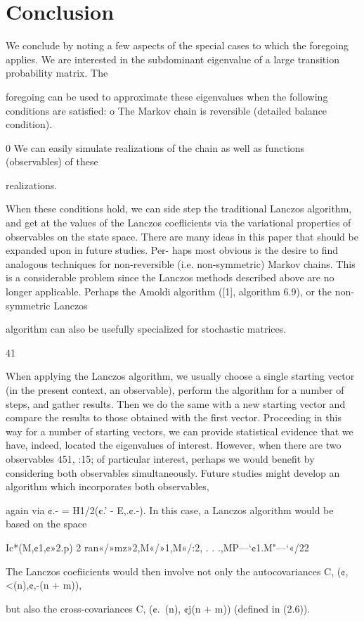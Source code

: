 \chapter{Conclusion}
\label{cha:conclusion}

We conclude by noting a few aspects of the special cases to which the foregoing applies.
We are interested in the subdominant eigenvalue of a large transition probability matrix. The

foregoing can be used to approximate these eigenvalues when the following conditions are satisﬁed:
o The Markov chain is reversible (detailed balance condition).

0 We can easily simulate realizations of the chain as well as functions (observables) of these

realizations.

When these conditions hold, we can side step the traditional Lanczos algorithm, and get at the
values of the Lanczos coeﬂicients via the variational properties of observables on the state space.
There are many ideas in this paper that should be expanded upon in future studies. Per-
haps most obvious is the desire to ﬁnd analogous techniques for non-reversible (i.e. non-symmetric)
Markov chains. This is a considerable problem since the Lanczos methods described above are no
longer applicable. Perhaps the Amoldi algorithm ([1], algorithm 6.9), or the non-symmetric Lanczos

algorithm can also be usefully specialized for stochastic matrices.

41

When applying the Lanczos algorithm, we usually choose a single starting vector (in the
present context, an observable), perform the algorithm for a number of steps, and gather results.
Then we do the same with a new starting vector and compare the results to those obtained with
the ﬁrst vector. Proceeding in this way for a number of starting vectors, we can provide statistical
evidence that we have, indeed, located the eigenvalues of interest. However, when there are two
observables 451, :15; of particular interest, perhaps we would beneﬁt by considering both observables
simultaneously. Future studies might develop an algorithm which incorporates both observables,

again via ¢.- = H1/2(¢.' - E,.¢.-). In this case, a Lanczos algorithm would be based on the space

Ic*(M,¢1,¢»2.p) 2 ran{«/»mz»2,M«/»1,M«/:2, . . .,MP—‘¢1.M"—‘«/22}

The Lanczos coeﬁicients would then involve not only the autocovariances C, (¢,<(n),¢,-(n + m)),

but also the cross-covariances C, (¢.~(n), ¢j(n + m)) (deﬁned in (2.6)).

